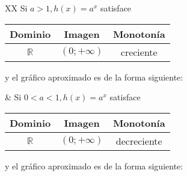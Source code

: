 \documentclass[Análisis.root.tex]{subfiles}
\newcommand{\R}{\mathbb{R}}
\begin{document}
        {
            \def\arraystretch{1.5}
            \begin{tabularx}{\textwidth}{XX}
                Si \(a>1, h(x)=a^x\) satisface
                \begin{center}
                    \begin{tabular}{|c|c|c|}
                        \hline
                        Dominio & Imagen & Monotonía\\\hline
                        \(\R\) & \((0;+\infty)\) & creciente\\
                        \hline
                    \end{tabular}
                \end{center}
                y el gráfico aproximado es de la forma siguiente:
                \begin{center}
                \end{center} 
                &
                Si \(0<a<1, h(x)=a^x\) satisface
                \begin{center}
                    \begin{tabular}{|c|c|c|}
                        \hline
                        Dominio & Imagen & Monotonía\\\hline
                        \(\R\) & \((0;+\infty)\) & decreciente\\
                        \hline
                    \end{tabular}
                \end{center}
                y el gráfico aproximado es de la forma siguiente:
                \begin{center}
                    \begin{tikzpicture}
                        \begin{axis}[

\end{axis}
\end{tikzpicture}
\end{center}
\end{tabularx}}
\end{document}
